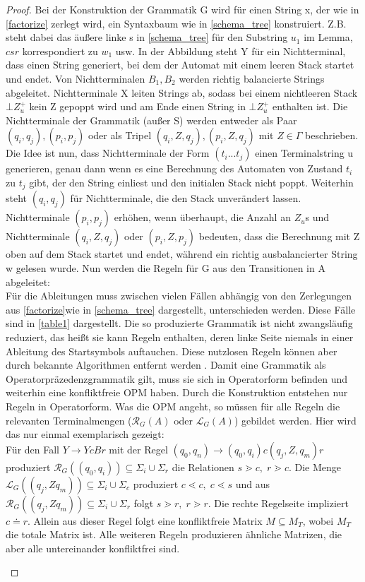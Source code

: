 \begin{proof}
Bei der Konstruktion der Grammatik G wird für einen String x, der wie in \autoref{factorize} zerlegt wird, ein Syntaxbaum wie in \autoref{schema_tree}  konstruiert. Z.B. steht dabei das äußere linke s in \autoref{schema_tree} für den Substring $u_1$ im Lemma, $csr$ korrespondiert zu $w_1$ usw. 
In der Abbildung steht Y für ein Nichtterminal, dass einen String generiert, bei dem der Automat mit einem leeren Stack startet und endet.
Von Nichtterminalen $B_1, B_2$ werden richtig balancierte Strings abgeleitet. Nichtterminale X leiten Strings ab, sodass bei einem nichtleeren Stack $\bot Z_u^+$ kein Z gepoppt wird und am Ende einen String in $\bot Z_u^+$ enthalten ist. Die Nichtterminale der Grammatik (außer S) werden entweder als Paar $(q_i, q_j) , (p_i, p_j)$ oder als Tripel $(q_i, Z, q_j), (p_i, Z, q_j)$ mit $Z \in \Gamma$ beschrieben. Die Idee ist nun, dass Nichtterminale der Form $(t_i...t_j)$ einen Terminalstring u generieren, genau dann wenn es eine Berechnung des Automaten  von Zustand $t_i$ zu $t_j$ gibt, der den String einliest und den initialen Stack nicht poppt. Weiterhin steht $(q_i, q_j)$ für Nichtterminale, die den Stack unverändert lassen. Nichtterminale $(p_i, p_j)$ erhöhen, wenn überhaupt, die Anzahl an $Z_u$s und Nichtterminale $(q_i, Z, q_j)$ oder $(p_i, Z, p_j)$ bedeuten, dass die Berechnung mit Z oben auf dem Stack startet und endet, während ein richtig ausbalancierter String w gelesen wurde. Nun werden die Regeln für G aus den Transitionen in A abgeleitet: \\
Für die Ableitungen muss zwischen vielen Fällen abhängig von den Zerlegungen aus \ref{factorize}wie in \autoref{schema_tree} dargestellt, unterschieden werden. Diese Fälle sind in \autoref{table1} dargestellt.
Die so produzierte Grammatik ist nicht zwangsläufig reduziert, das heißt sie kann Regeln enthalten, deren linke Seite niemals in einer Ableitung des Startsymbols auftauchen. Diese nutzlosen Regeln können aber durch bekannte Algorithmen entfernt werden \cite{formallanguage}.
Damit eine Grammatik als Operatorpräzedenzgrammatik gilt, muss sie sich in Operatorform befinden und weiterhin eine konfliktfreie OPM haben. Durch die Konstruktion entstehen nur Regeln in Operatorform. Was die OPM angeht, so müssen für alle Regeln die relevanten Terminalmengen ($\mathcal{R}_G(A)$ oder $\mathcal{L}_G(A)$) gebildet werden. Hier wird das nur einmal exemplarisch gezeigt: \\
Für den Fall $Y \rightarrow YcBr$ mit der Regel $(q_0, q_n) \rightarrow (q_0, q_i)c(q_j, Z, q_m)r$ produziert $\mathcal{R}_G ((q_0,q_i))\subseteq \Sigma_i \cup \Sigma_r$ die Relationen $s \gtrdot c, \; r \gtrdot c$. Die Menge $\mathcal{L}_G ((q_j,Z q_m))\subseteq \Sigma_i \cup \Sigma_c$ produziert $c\lessdot c, \; c \lessdot s$ und aus $\mathcal{R}_G ((q_j,Z q_m))\subseteq \Sigma_i \cup \Sigma_r$ folgt $ s \gtrdot r, \; r \gtrdot r$. Die rechte Regelseite impliziert $c \doteq r$. Allein aus dieser Regel folgt eine konfliktfreie Matrix $M \subseteq M_T$, wobei $M_T$ die totale Matrix ist. Alle weiteren Regeln produzieren ähnliche Matrizen, die aber alle untereinander konfliktfrei sind. 
\begin{table}
\begin{center}


\end{center}
\end{table}
\end{proof}

